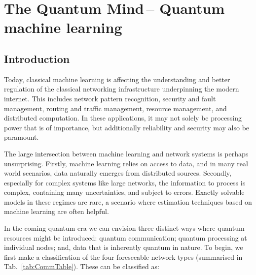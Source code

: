 %
%

\section{The Quantum Mind\texttrademark\,-- Quantum machine learning}\label{sec:quantum_mind}

\newline


  


\subsection{Introduction}

Today, classical machine learning is affecting the understanding and better regulation of the classical networking infrastructure underpinning the modern internet. This includes network pattern recognition, security and fault management, routing and traffic management, resource management, and distributed computation. In these applications, it may not solely be processing power that is of importance, but additionally reliability and security may also be paramount.

The large intersection between machine learning and network systems is perhaps unsurprising. Firstly, machine learning relies on access to data, and in many real world scenarios, data naturally emerges from distributed sources. Secondly, especially for complex systems like large networks, the information to process is complex, containing many uncertainties, and subject to errors. Exactly solvable models in these regimes are rare, a scenario where estimation techniques based on machine learning are often helpful.

In the coming quantum era we can envision three distinct ways where quantum resources might be introduced: quantum communication; quantum processing at individual nodes; and, data that is inherently quantum in nature. To begin, we first make a classification of the four foreseeable network types (summarised in Tab.~\ref{tab:CommTable}). These can be classified as:

